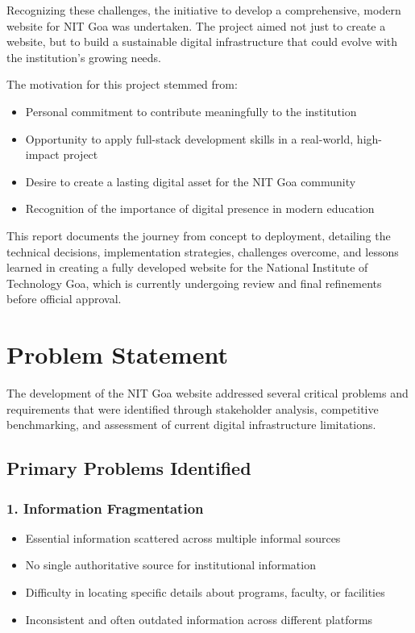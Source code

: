 \documentclass[12pt,a4paper]{report}
\begin{document}
Recognizing these challenges, the initiative to develop a comprehensive, modern website for NIT Goa was undertaken. The project aimed not just to create a website, but to build a sustainable digital infrastructure that could evolve with the institution's growing needs.

\vspace{0.5cm}

The motivation for this project stemmed from:
\begin{itemize}
    \item Personal commitment to contribute meaningfully to the institution
    \item Opportunity to apply full-stack development skills in a real-world, high-impact project
    \item Desire to create a lasting digital asset for the NIT Goa community
    \item Recognition of the importance of digital presence in modern education
\end{itemize}

This report documents the journey from concept to deployment, detailing the technical decisions, implementation strategies, challenges overcome, and lessons learned in creating a fully developed website for the National Institute of Technology Goa, which is currently undergoing review and final refinements before official approval.

\section{Problem Statement}

The development of the NIT Goa website addressed several critical problems and requirements that were identified through stakeholder analysis, competitive benchmarking, and assessment of current digital infrastructure limitations.

\subsection*{Primary Problems Identified}

\subsubsection*{1. Information Fragmentation}
\begin{itemize}
    \item Essential information scattered across multiple informal sources
    \item No single authoritative source for institutional information
    \item Difficulty in locating specific details about programs, faculty, or facilities
    \item Inconsistent and often outdated information across different platforms
\end{itemize}
\end{document}
